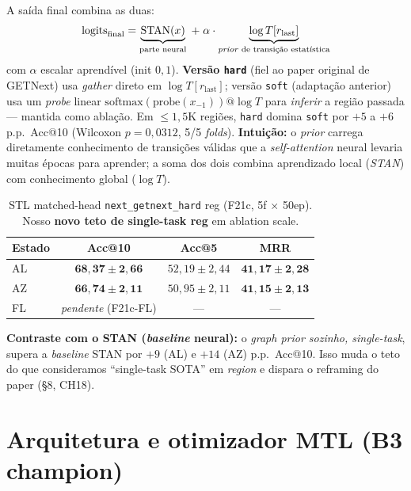 \documentclass[11pt,a4paper]{article}
\begin{document}
A saída final combina as duas:
$$
\text{logits}_\text{final} = \underbrace{\text{STAN}(x)}_{\text{parte neural}} \;+\; \alpha \cdot \underbrace{\log T[r_\text{last}]}_{\text{\textit{prior} de transição estatística}}
$$
com $\alpha$ escalar aprendível (init $0{,}1$). \textbf{Versão \texttt{hard}} (fiel ao paper original de GETNext) usa \textit{gather} direto em $\log T[r_\text{last}]$; versão \texttt{soft} (adaptação anterior) usa um \textit{probe} linear $\text{softmax}(\text{probe}(x_{-1})) @ \log T$ para \textit{inferir} a região passada --- mantida como ablação. Em $\le 1{,}5$K regiões, \texttt{hard} domina \texttt{soft} por $+5$ a $+6$ p.p.\ Acc@10 (Wilcoxon $p=0{,}0312$, 5/5 \textit{folds}). \textbf{Intuição:} o \textit{prior} carrega diretamente conhecimento de transições válidas que a \textit{self-attention} neural levaria muitas épocas para aprender; a soma dos dois combina aprendizado local (\textit{STAN}) com conhecimento global (\textit{$\log T$}).

\begin{table}[H]
\centering
\small
\caption{STL matched-head \texttt{next\_getnext\_hard} reg (F21c, 5f $\times$ 50ep). Nosso \textbf{novo teto de single-task reg} em ablation scale.}
\begin{tabular}{lccc}
\toprule
\textbf{Estado} & \textbf{Acc@10} & \textbf{Acc@5} & \textbf{MRR} \\
\midrule
AL & $\mathbf{68{,}37 \pm 2{,}66}$ & $52{,}19 \pm 2{,}44$ & $\mathbf{41{,}17 \pm 2{,}28}$ \\
AZ & $\mathbf{66{,}74 \pm 2{,}11}$ & $50{,}95 \pm 2{,}11$ & $\mathbf{41{,}15 \pm 2{,}13}$ \\
FL & \textit{pendente} (F21c-FL) & --- & --- \\
\bottomrule
\end{tabular}
\end{table}

\textbf{Contraste com o STAN (\textit{baseline} neural):} o \textit{graph prior sozinho, single-task}, supera a \textit{baseline} STAN por $+9$ (AL) e $+14$ (AZ) p.p.\ Acc@10. Isso muda o teto do que consideramos ``single-task SOTA'' em \textit{region} e dispara o reframing do paper (§8, CH18).

\section{Arquitetura e otimizador MTL (B3 champion)}
\end{document}
